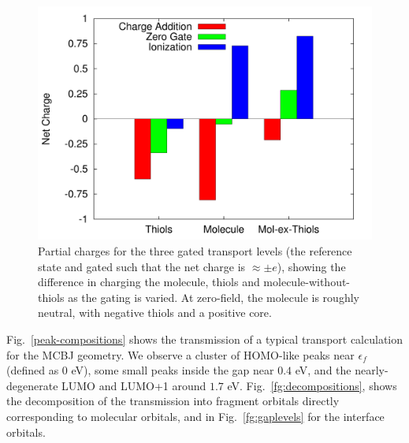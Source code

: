 \documentclass[aip,jcp,a4paper,reprint,floatfix,superscriptaddress]{revtex4-1}
\begin{document}


\begin{figure}
\includegraphics[width=.9\columnwidth]{img/gating}
\caption{Partial charges for the three gated transport levels (the reference state and gated such that the net charge is $\approx\pm e$), showing the difference in charging the molecule, thiols and molecule-without-thiols as the gating is varied. At zero-field, the molecule is roughly neutral, with negative thiols and a positive core.} \label{fg:gated_charges}
\end{figure}

Fig.~\ref{peak-compositions} shows the transmission of a typical transport calculation for the MCBJ geometry. %
We observe a cluster of HOMO-like peaks near $\epsilon_f$ (defined as $0$ eV), some small peaks inside the gap near $0.4$ eV, and the nearly-degenerate LUMO and LUMO+1 around $1.7$ eV. Fig.~\ref{fg:decompositions}, shows the decomposition of the transmission into fragment orbitals directly corresponding to molecular orbitals, and in Fig.~\ref{fg:gaplevels} for the interface orbitals.
\end{document}

